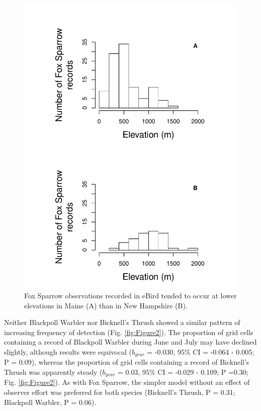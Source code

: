 \documentclass[fleqn,10pt,lineno]{wlpeerj} %
\begin{document}
\begin{figure}[ht]\centering
\includegraphics[width=\linewidth]{Figure3}
\caption{Fox Sparrow observations recorded in eBird tended to occur at lower elevations in Maine (A) than in New Hampshire (B).}
\label{fig:Figure3}
\end{figure}

Neither Blackpoll Warbler nor Bicknell’s Thrush showed a similar pattern of increasing frequency of detection (Fig. \ref{fig:Figure2}). The proportion of grid cells containing a record of Blackpoll Warbler during June and July may have declined slightly, although results were equivocal ($b_{year}$ = -0.030, 95\% CI = -0.064 - 0.005; P = 0.09), whereas the proportion of grid cells containing a record of Bicknell’s Thrush was apparently steady ($b_{year}$ = 0.03, 95\% CI = -0.029 - 0.109; P =0.30; Fig. \ref{fig:Figure2}). As with Fox Sparrow, the simpler model without an effect of observer effort was preferred for both species (Bicknell’s Thrush, P = 0.31; Blackpoll Warbler, P = 0.06). 
\end{document}
